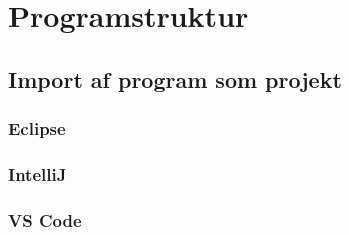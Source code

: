 \section{Programstruktur}\label{sec:struct}
\subsection{Import af program som projekt}
\subsubsection{Eclipse}
\subsubsection{IntelliJ}
\subsubsection{VS Code}
